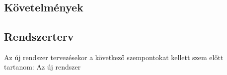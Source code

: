 \chapter{\SystemDesign}
\section{Követelmények}



\section{Rendszerterv}


Az új rendszer tervezésekor a következő szempontokat kellett szem előtt tartanom:
Az új rendszer 



